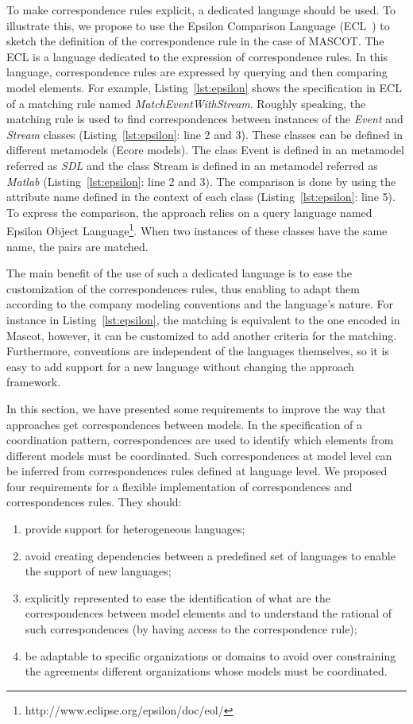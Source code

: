 To make correspondence rules explicit, a dedicated language should be used. To illustrate this, we propose to use the Epsilon Comparison Language (ECL~\cite{epsilonbib}) to sketch the definition of the correspondence rule in the case of MASCOT. The ECL is a language dedicated to the expression of correspondence rules. In this language, correspondence rules are expressed by querying and then comparing model elements. For example, Listing~\ref{lst:epsilon} shows the specification in ECL of a matching rule named \emph{MatchEventWithStream}. Roughly speaking, the matching rule is used to find correspondences between instances of the \emph{Event} and \emph{Stream} classes (Listing~\ref{lst:epsilon}: line 2 and 3). These classes can be defined in different metamodels (\ie Ecore models). The class Event is defined in an metamodel referred as \emph{SDL} and the class Stream is defined in an metamodel referred as \emph{Matlab} (Listing~\ref{lst:epsilon}: line 2 and 3). The comparison is done by using the attribute name defined in the context of each class (Listing~\ref{lst:epsilon}: line 5). To express the comparison, the approach relies on a query language named Epsilon Object Language\footnote{http://www.eclipse.org/epsilon/doc/eol/}. When two instances of these classes have the same name, the pairs are matched.
	
The main benefit of the use of such a dedicated language is to ease the customization of the correspondences rules, thus enabling to adapt them according to the company modeling conventions and the language's nature. For instance in Listing~\ref{lst:epsilon}, the matching is equivalent to the one encoded in Mascot, however, it can be customized to add another criteria for the matching. Furthermore, conventions are independent of the languages themselves, so it is easy to add support for a new language without changing the approach framework.
	

In this section, we have presented some requirements to improve the way that approaches get correspondences between models. In the specification of a coordination pattern, correspondences are used to identify which elements from different models must be coordinated. Such correspondences at model level can be inferred from correspondences rules defined at language level. We proposed four requirements for a flexible implementation of correspondences and correspondences rules. They should: 
\begin{enumerate}
\item provide support for heterogeneous languages;
\item avoid creating dependencies between a predefined set of languages to enable the support of new languages;
\item explicitly represented to ease the identification of what are the correspondences between model elements and to understand the rational of such correspondences (by having access to the correspondence rule);
\item be adaptable to specific organizations or domains to avoid over constraining the agreements different organizations whose models must be coordinated.
\end{enumerate}

